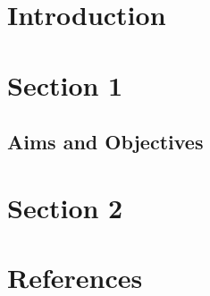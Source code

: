 \documentclass[12pt]{article}
\begin{document}
\section{Introduction}


\section{Section 1}


\subsection{Aims and Objectives}


\section{Section 2}



\clearpage

\section{References}
\end{document}

